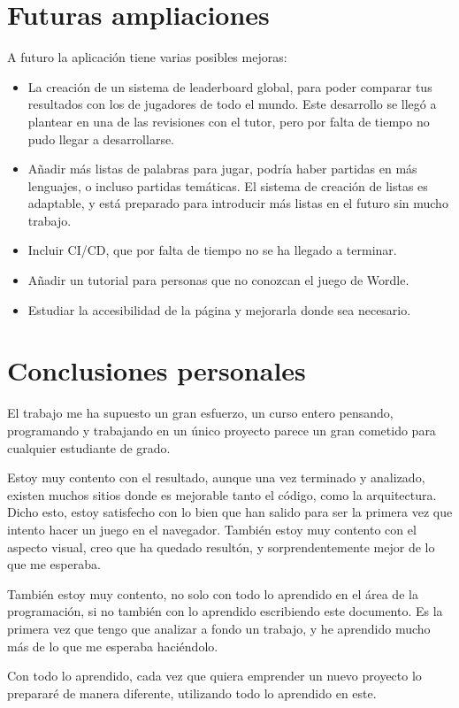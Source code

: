 \section{Futuras ampliaciones}
A futuro la aplicación tiene varias posibles mejoras:

\begin{itemize}
	\item La creación de un sistema de leaderboard global, para poder comparar tus resultados con los de jugadores de todo el mundo. Este desarrollo se llegó a plantear en una de las revisiones con el tutor, pero por falta de tiempo no pudo llegar a desarrollarse. 
	\item Añadir más listas de palabras para jugar,  podría haber partidas en más lenguajes, o incluso partidas temáticas. El sistema de creación de listas es adaptable, y está preparado para introducir más listas en el futuro sin mucho trabajo.
	\item Incluir CI/CD, que por falta de tiempo no se ha llegado a terminar.
	\item Añadir un tutorial para personas que no conozcan el juego de Wordle.
	\item Estudiar la accesibilidad de la página y mejorarla donde sea necesario.
\end{itemize}


\section{Conclusiones personales}
El trabajo me ha supuesto un gran esfuerzo, un curso entero pensando, programando y trabajando en un único proyecto parece un gran cometido para cualquier estudiante de grado.

Estoy muy contento con el resultado, aunque una vez terminado y analizado, existen muchos sitios donde es mejorable tanto el código, como la arquitectura. Dicho esto, estoy satisfecho con lo bien que han salido para ser la primera vez que intento hacer un juego en el navegador. También estoy muy contento con el aspecto visual, creo que ha quedado resultón, y sorprendentemente mejor de lo que me esperaba.

También estoy muy contento, no solo con todo lo aprendido en el área de la programación, si no también con lo aprendido escribiendo este documento. Es la primera vez que tengo que analizar a fondo un trabajo, y he aprendido mucho más de lo que me esperaba haciéndolo.

Con todo lo aprendido, cada vez que quiera emprender un nuevo proyecto lo prepararé de manera diferente, utilizando todo lo aprendido en este.
